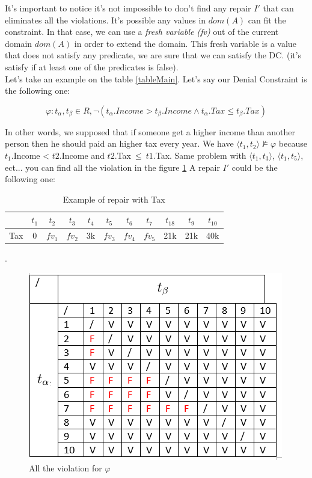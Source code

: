 \documentclass[letterpaper, 12pt]{report}
\begin{document}
It's important to notice it's not impossible to don't find any repair $I'$ that can eliminates all the violations. It's possible any values in $dom(A)$ can fit the constraint. In that case, we can use a \emph{fresh variable (fv)} out of the current domain $dom(A)$ in order to extend the domain. This fresh variable is a value that does not satisfy any predicate, we are sure that we can satisfy the DC. (it's satisfy if at least one of the predicates is false).\\

Let's take an example on the table \ref{tableMain}. Let's say our Denial Constraint is the following one:

$$ \varphi : t_\alpha,t_\beta \in R, \neg(t_\alpha.Income > t_\beta.Income \wedge t_\alpha.Tax \leq t_\beta.Tax)$$

In other words, we supposed that if someone get a higher income than another person then he should paid an higher tax every year. We have $ \langle t_1,t_2 \rangle \not\models \varphi $ because $t_1$.Income < $t2.$Income and $t2$.Tax$\ \leq\ t1$.Tax. Same problem with $ \langle t_1,t_3 \rangle$, $ \langle t_1,t_5 \rangle$, ect... you can find all the violation in the figure \ref{BadTax} A repair $I'$ could be the following one:

\begin{table}[H]
	\centering
	\begin{tabular}{|c|c c c c c c c c c c|}
	\hline
	   & $t_1$ & $t_2$ & $t_3$ &$t_4$ &$t_5$ &$t_6$ &$t_7$ &$t_18$ &$t_9$ &$t_10$ \\
	\hline
	 Tax & 0 & \color{red} $fv_1$ & \color{red} $fv_2$& 3k & \color{orange}$fv_3$& \color{orange} $fv_4$& \color{orange} $fv_5$& 21k & 21k & 40k\\
	 \hline
	\end{tabular}
	\caption{\label{tableExample} Example of repair with Tax}.
\end{table}


\begin{figure}
	\centering
	\includegraphics[scale=1]{img/TaxBad}
	\caption{\label{BadTax} All the violation for $\varphi$}
\end{figure}
\end{document}
